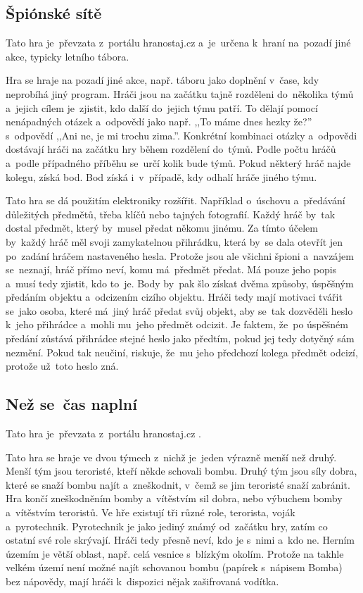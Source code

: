 \vspace{-2mm}
\subsection{Špiónské sítě \label{SpionskeSite}}
Tato hra je~převzata z~portálu hranostaj.cz \cite{SpionskeSite} a~je~určena k~hraní na~pozadí jiné akce, typicky letního tábora.

Hra se hraje na pozadí jiné akce, např. táboru jako doplnění v~čase, kdy neprobíhá jiný program.
Hráči jsou na začátku tajně rozděleni do~několika týmů a~jejich cílem je~zjistit, kdo další do~jejich týmu patří.
To dělají pomocí nenápadných otázek a~odpovědí jako např. ,,To máme dnes hezky že?'' s~odpovědí ,,Ani ne, je mi trochu zima.''.
Konkrétní kombinaci otázky a~odpovědi dostávají hráči na začátku hry během rozdělení do~týmů.
Podle počtu hráčů a~podle případného příběhu se~určí kolik bude týmů.
Pokud některý hráč najde kolegu, získá bod.
Bod získá i~v~případě, kdy odhalí hráče jiného týmu.

Tato hra se dá použitím elektroniky rozšířit.
Například o~úschovu a~předávání důležitých předmětů, třeba klíčů nebo tajných fotografií.
Každý hráč by~tak dostal předmět, který by~musel předat někomu jinému.
Za tímto účelem by~každý hráč měl svoji zamykatelnou přihrádku, která by~se dala otevřít jen po~zadání hráčem nastaveného hesla.
Protože jsou ale všichni špioni a~navzájem se~neznají, hráč přímo neví, komu má~předmět předat.
Má pouze jeho popis a~musí tedy zjistit, kdo to~je.
Body by~pak šlo získat dvěma způsoby, úspěšným předáním objektu a~odcizením cizího objektu.
Hráči tedy mají motivaci tvářit se~jako osoba, které má~jiný hráč předat svůj objekt, aby se~tak dozvěděli heslo k~jeho přihrádce a~mohli mu~jeho předmět odcizit.
Je faktem, že~po úspěšném předání zůstává přihrádce stejné heslo jako předtím, pokud jej tedy dotyčný sám nezmění.
Pokud tak neučiní, riskuje, že~mu jeho předchozí kolega předmět odcizí, protože už~toto heslo zná.

\vspace{-2mm}
\subsection{Než se~čas naplní}
Tato hra je~převzata z~portálu hranostaj.cz \cite{NezSeCasNaplni}.

Tato hra se hraje ve dvou týmech z~nichž je~jeden výrazně menší než druhý.
Menší tým jsou teroristé, kteří někde schovali bombu.
Druhý tým jsou síly dobra, které se snaží bombu najít a~zneškodnit, v~čemž se jim teroristé snaží zabránit.
Hra končí zneškodněním bomby a~vítěstvím sil dobra, nebo výbuchem bomby a~vítěstvím teroristů.
Ve hře existují tři různé role, terorista, voják a~pyrotechnik.
Pyrotechnik je jako jediný známý od~začátku hry, zatím co ostatní své role skrývají.
Hráči tedy přesně neví, kdo je s~nimi a~kdo ne.
Herním územím je větší oblast, např. celá vesnice s~blízkým okolím.
Protože na takhle velkém území není možné najít schovanou bombu (papírek s~nápisem Bomba) bez nápovědy, mají hráči k~dispozici nějak zašifrovaná vodítka.

